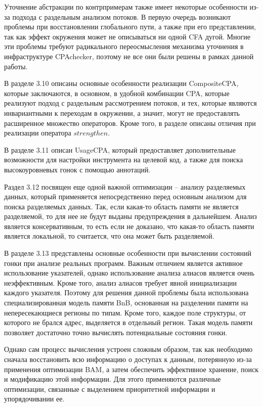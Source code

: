 Уточнение абстракции по контрпримерам также имеет некоторые особенности из-за подхода с раздельным анализом потоков.
В первую очередь возникают проблемы при восстановлении глобального пути, а также при его представлении, так как эффект окружения может не описываться ни одной CFA дугой.
Многие эти проблемы требуют радикального переосмысления механизма уточнения в инфраструктуре CPAchecker, поэтому не все они были решены в рамках данной работы.

В разделе 3.10 описаны основные особенности реализации CompositeCPA, которые заключаются, в основном, в удобной комбинации CPA, которые реализуют подход с раздельным рассмотрением потоков, и тех, которые являются инвариантными к переходам в окружении, а значит, могут не предоставлять расширенное множество операторов. 
Кроме того, в разделе описаны отличия при реализации оператора $strengthen$.

В разделе 3.11 описан UsageCPA, который предоставляет дополнительные возможности для настройки инструмента на целевой код, а также для поиска высокоуровневых гонок с помощью аннотаций.

Раздел 3.12 посвящен еще одной важной оптимизации -- анализу разделяемых данных, который применяется непосредственно перед основным анализом для поиска разделяемых данных.
Так, если какая-то область памяти не является разделяемой, то для нее не будут выданы предупреждения в дальнейшем.
Анализ является консервативным, то есть если не доказано, что какая-то область памяти является локальной, то считается, что она может быть разделяемой.

В разделе 3.13 представлены основные особенности при вычислении состояний гонки при анализе реальных программ.
Важным отличием является активное использование указателей, однако использование анализа алиасов является очень неэффективным.
Кроме того, анализ алиасов требует явной инициализации каждого указателя. Поэтому для решения данной проблемы была использована специализированная модель памяти BnB, основанная на разделении памяти на непересекающиеся регионы по типам.
Кроме того, каждое поле структуры, от которого не брался адрес, выделяется в отдельный регион.
Такая модель памяти позволяет достаточно точно вычислять потенциальные состояния гонки.

Однако сам процесс вычисления устроен сложным образом, так как необходимо сначала восстановить всю информацию о доступах к данным, потерянную из-за применения оптимизации BAM, а затем обеспечить эффективное хранение, поиск и модификацию этой информации.
Для этого применяются различные оптимизации, связанные с выделением приоритетной информации и упорядочивании ее. 

